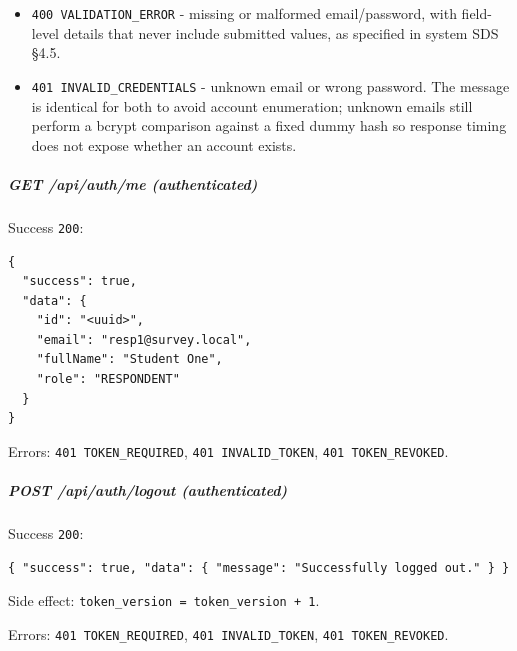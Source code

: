 \documentclass[12pt,a4paper]{article}
\begin{document}
\begin{itemize}[leftmargin=*]
\item \texttt{400 VALIDATION\_ERROR} - missing or malformed email/password, with field-level details that never include submitted values, as specified in system SDS \S{}4.5.
\item \texttt{401 INVALID\_CREDENTIALS} - unknown email or wrong password. The message is identical for both to avoid account enumeration; unknown emails still perform a bcrypt comparison against a fixed dummy hash so response timing does not expose whether an account exists.
\end{itemize}

\subparagraph*{GET /api/auth/me (authenticated)}
Success \texttt{200}:

\begin{lstlisting}
{
  "success": true,
  "data": {
    "id": "<uuid>",
    "email": "resp1@survey.local",
    "fullName": "Student One",
    "role": "RESPONDENT"
  }
}
\end{lstlisting}

Errors: \texttt{401 TOKEN\_REQUIRED}, \texttt{401 INVALID\_TOKEN}, \texttt{401 TOKEN\_REVOKED}.

\subparagraph*{POST /api/auth/logout (authenticated)}
Success \texttt{200}:

\begin{lstlisting}
{ "success": true, "data": { "message": "Successfully logged out." } }
\end{lstlisting}

Side effect: \texttt{token\_version = token\_version + 1}.

Errors: \texttt{401 TOKEN\_REQUIRED}, \texttt{401 INVALID\_TOKEN}, \texttt{401 TOKEN\_REVOKED}.

\end{document}
